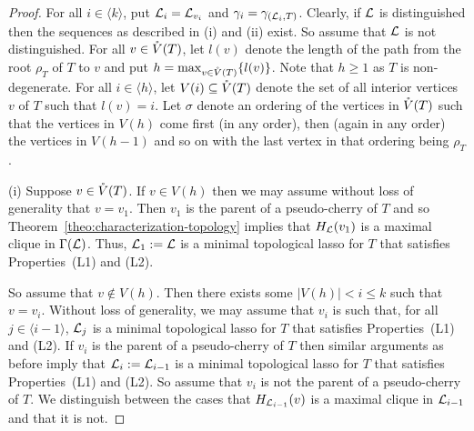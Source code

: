 \begin{proof}
For all $i\in \langle k\rangle$, put ${\mathcal L}_i={\mathcal L}_{v_{i}}$
and $\gamma_i=\gamma_{({\mathcal L}_i,T)}$.  Clearly, 
if ${\mathcal L}$ is distinguished then the sequences as described in (i) and (ii) 
exist. So assume that ${\mathcal L}$ is not distinguished.
For all $v\in \mathring{V}(T)$, let $l(v)$ denote the length of the path
from the root $\rho_T$ of $T$ to $v$ and put $h=\max_{v\in \mathring{V}(T)}\{l(v)\}$.
Note that $h\geq 1$ as $T$ is non-degenerate.
For all $i\in \langle h\rangle$, let
 $V(i)\subseteq \mathring{V}(T)$ denote the set of all interior vertices $v$
of $T$ such that $l(v)=i$.
Let $\sigma$ denote an ordering of the vertices in $\mathring{V}(T)$ such that the 
vertices in $V(h)$ come first (in any order), then (again in any order)
the vertices in $V(h-1)$ and so on with the last vertex in that ordering 
being $\rho_T$. 

(i) Suppose $v\in \mathring{V}(T)$. If $v\in V(h)$ then
we may assume without loss of generality
that $v=v_1$. Then $v_1$ is the parent of a pseudo-cherry of $T$ 
and so Theorem~\ref{theo:characterization-topology} implies that
$H_{{\mathcal L}}(v_1)$ is a maximal clique in $\Gamma({\mathcal L})$. Thus, 
${\mathcal L}_1:={\mathcal L}$ is a minimal topological lasso for $T$ that
satisfies Properties~(L1) and (L2).

So assume that $v\not\in V(h)$. Then there exists some 
$|V(h)|< i\leq k$ such that $v=v_i$. Without loss of 
generality, we may assume that $v_i$ is such that,
for all $j\in \langle i-1\rangle$, ${\mathcal L}_j$ is a minimal 
topological lasso for $T$ that satisfies 
Properties~(L1) and (L2).
If $v_i$ is the parent of a pseudo-cherry of $T$ then similar arguments 
as before imply that ${\mathcal L}_i:={\mathcal L}_{i-1}$ is a minimal topological
lasso for $T$ that satisfies Properties~(L1) and (L2). So assume
that $v_i$ is not the parent of a pseudo-cherry of $T$.
We distinguish between the cases that 
$H_{{\mathcal L}_{i-1}}(v)$ is a maximal clique in ${\mathcal L}_{i-1}$
and that it is not. 


\end{proof}
